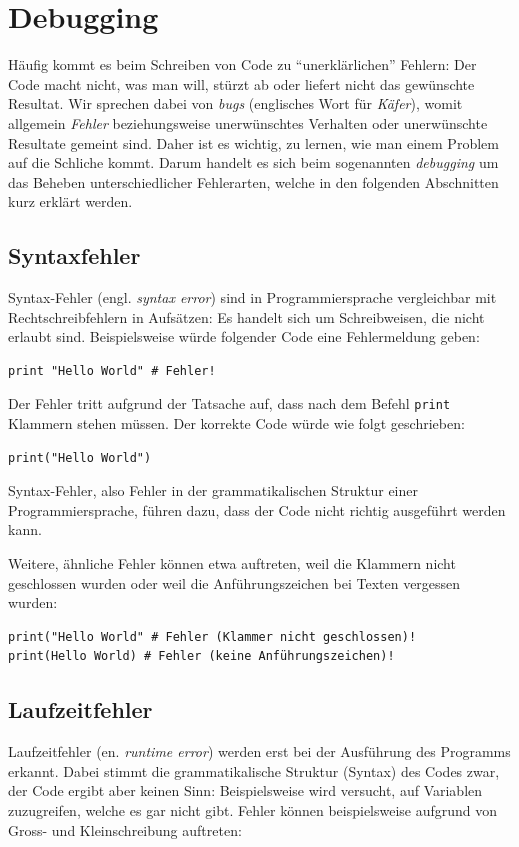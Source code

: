 \section{Debugging}

Häufig kommt es beim Schreiben von Code zu \enquote{unerklärlichen} Fehlern: Der Code macht nicht, was man will, stürzt ab oder liefert nicht das gewünschte Resultat. Wir sprechen dabei von \textit{bugs} (englisches Wort für \textit{Käfer}), womit allgemein \textit{Fehler} beziehungsweise unerwünschtes Verhalten oder unerwünschte Resultate gemeint sind. Daher ist es wichtig, zu lernen, wie man einem Problem auf die Schliche kommt. Darum handelt es sich beim sogenannten \textit{debugging} um das Beheben unterschiedlicher Fehlerarten, welche in den folgenden Abschnitten kurz erklärt werden.

\subsection{Syntaxfehler}
Syntax-Fehler (engl. \textit{syntax error}) sind in Programmiersprache vergleichbar mit Rechtschreibfehlern in Aufsätzen: Es handelt sich um Schreibweisen, die nicht erlaubt sind. Beispielsweise würde folgender Code eine Fehlermeldung geben:

\begin{lstlisting}
print "Hello World" # Fehler!
\end{lstlisting}


Der Fehler tritt aufgrund der Tatsache auf, dass nach dem Befehl \lstinline|print| Klammern stehen müssen. Der korrekte Code würde wie folgt geschrieben:

\begin{lstlisting}
print("Hello World")
\end{lstlisting}

Syntax-Fehler, also Fehler in der grammatikalischen Struktur einer Programmiersprache, führen dazu, dass der Code nicht richtig ausgeführt werden kann.

Weitere, ähnliche Fehler können etwa auftreten, weil die Klammern nicht geschlossen wurden oder weil die Anführungszeichen bei Texten vergessen wurden:

\begin{lstlisting}
print("Hello World" # Fehler (Klammer nicht geschlossen)!
print(Hello World) # Fehler (keine Anführungszeichen)!
\end{lstlisting}

\subsection{Laufzeitfehler}
Laufzeitfehler (en. \textit{runtime error}) werden erst bei der Ausführung des Programms erkannt. Dabei stimmt die grammatikalische Struktur (Syntax) des Codes zwar, der Code ergibt aber keinen Sinn: Beispielsweise wird versucht, auf Variablen zuzugreifen, welche es gar nicht gibt. Fehler können beispielsweise aufgrund von Gross- und Kleinschreibung auftreten:

